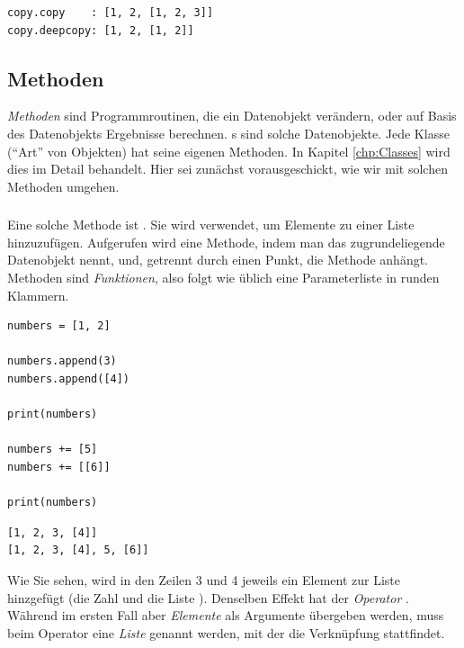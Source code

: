 \begin{cmdbox}[Ausgabe]
\begin{verbatim}
copy.copy    : [1, 2, [1, 2, 3]]
copy.deepcopy: [1, 2, [1, 2]]
\end{verbatim}
\end{cmdbox}


\subsection{Methoden}
\emph{Methoden} sind Programmroutinen, die ein Datenobjekt verändern, oder auf Basis des Datenobjekts Ergebnisse berechnen. s sind solche Datenobjekte. Jede Klasse (\ie \enquote{Art} von Objekten) hat seine eigenen Methoden. In Kapitel \ref{chp:Classes} wird dies im Detail behandelt. Hier sei zunächst vorausgeschickt, wie wir mit solchen Methoden umgehen.

\subsubsection{}
Eine solche Methode ist . Sie wird verwendet, um Elemente zu einer Liste hinzuzufügen. Aufgerufen wird eine Methode, indem man das zugrundeliegende Datenobjekt nennt, und, getrennt durch einen Punkt, die Methode anhängt. Methoden sind \emph{Funktionen}, also folgt wie üblich eine Parameterliste in runden Klammern.

\begin{codebox}
\begin{verbatim}
numbers = [1, 2]

numbers.append(3)
numbers.append([4])

print(numbers)

numbers += [5]
numbers += [[6]]

print(numbers)
\end{verbatim}
\end{codebox}

\begin{cmdbox}[Ausgabe]
\begin{verbatim}
[1, 2, 3, [4]]
[1, 2, 3, [4], 5, [6]]
\end{verbatim}
\end{cmdbox}

Wie Sie sehen, wird in den Zeilen 3 und 4 jeweils ein Element zur Liste hinzgefügt (die Zahl  und die Liste \inPy{[4]}). Denselben Effekt hat der \emph{Operator} \inPy{+=}. Während im ersten Fall aber \emph{Elemente} als Argumente übergeben werden, muss beim Operator eine \emph{Liste} genannt werden, mit der die Verknüpfung stattfindet.

